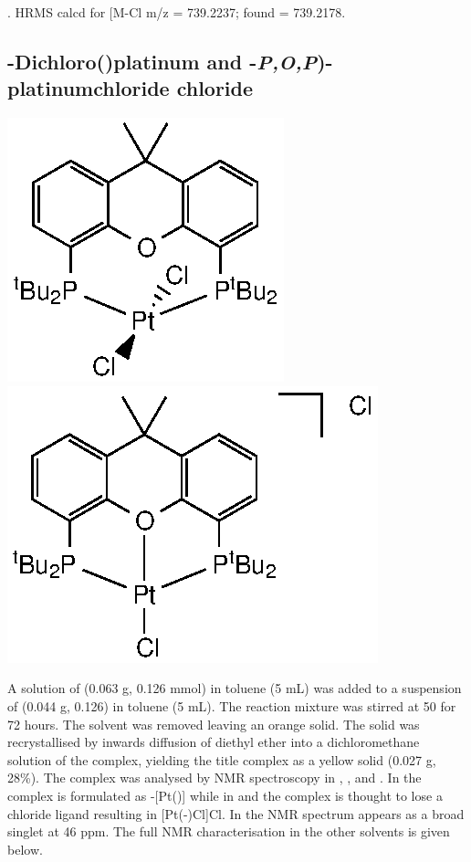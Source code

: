 .
HRMS calcd for  [M-Cl\ce{]+} m/z = 739.2237; found = 739.2178.

\subsection*{\trans-Dichloro(\tBuxantphos)platinum and \tBuXantphosk-\emph{P,O,P})-platinumchloride chloride}
\begin{structure}[h]
\begin{center}
\includegraphics{../Structures/CtBuPtCl2.eps}
\includegraphics{../Structures/CtBuPtClCl.eps}
\end{center}
\end{structure}

A solution of \tBuxantphos{} (0.063 g, 0.126 mmol) in toluene (5 mL) was added to a suspension of  (0.044 g, 0.126) in toluene (5 mL).  The reaction mixture was stirred at 50 \degC{} for 72 hours.  The solvent was removed  leaving an orange solid.  The solid was recrystallised by inwards diffusion of diethyl ether into a dichloromethane solution of the complex, yielding the title complex as a yellow solid (0.027 g, 28\%).  The complex was analysed by NMR spectroscopy in , ,  and .  In  the complex is formulated as \trans-[Pt(\tBuxantphos)] while in  and  the complex is thought to lose a chloride ligand resulting in [Pt(\tBuxantphos-\POP)Cl]Cl.  In  the \phosphorus{} NMR spectrum appears as a broad singlet at 46 ppm.  The full NMR characterisation in the other solvents is given below.  

